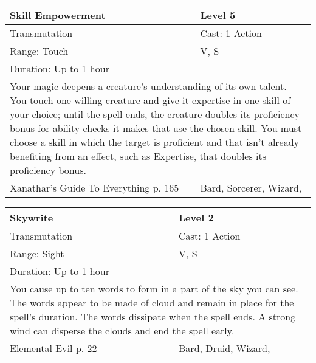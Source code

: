 \documentclass[11pt]{report}
\begin{document}
\begin{table}[H]
	\begin{tabular}{||p{6cm}|p{6cm}||}
		\hline\hline
		\bf{Skill Empowerment} & Level 5\\ \hline
		Transmutation & Cast: 1 Action\\ \hline
		Range: Touch & V, S\\ \hline
		Duration: Up to 1 hour & \\ \hline
		\multicolumn{2}{||p{12cm}||}{Your magic deepens a creature’s understanding of its own talent. You touch one willing creature and give it expertise in one skill of your choice; until the spell ends, the creature doubles its proficiency bonus for ability checks it makes that use the chosen skill.
You must choose a skill in which the target is proficient and that isn’t already benefiting from an effect, such as Expertise, that doubles its proficiency bonus.}\\ \hline
Xanathar's Guide To Everything p. 165 & Bard, Sorcerer, Wizard, \\ \hline\hline
	\end{tabular}
\end{table}

\begin{table}[H]
	\begin{tabular}{||p{6cm}|p{6cm}||}
		\hline\hline
		\bf{Skywrite} & Level 2\\ \hline
		Transmutation & Cast: 1 Action\\ \hline
		Range: Sight & V, S\\ \hline
		Duration: Up to 1 hour & \\ \hline
		\multicolumn{2}{||p{12cm}||}{You cause up to ten words to form in a part of the sky you can see. The words appear to be made of cloud and remain in place for the spell’s duration. The words dissipate when the spell ends. A strong wind can disperse the clouds and end the spell early.}\\ \hline
Elemental Evil p. 22 & Bard, Druid, Wizard, \\ \hline\hline
	\end{tabular}
\end{table}
\end{document}
